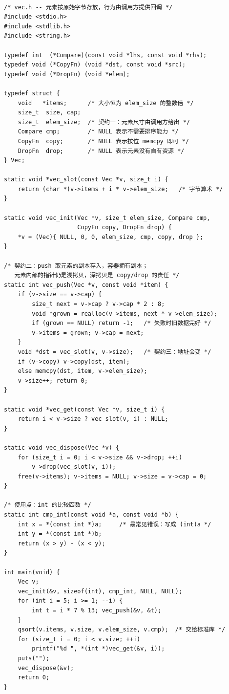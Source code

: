 \documentclass[12pt,a4paper,fontset=fandol]{ctexbook}
\newcommand{\clabel}{%
  \tcbox[on line,colback=cheadbg,colframe=cheadbg,
    boxrule=0pt,arc=1pt,left=2pt,right=2pt,top=1pt,bottom=1pt,
    colupper=white,fontupper=\scriptsize\bfseries]{C}}
\begin{document}
\clabel\ \begin{lstlisting}[style=cstyle,caption={字节存储 + 回调的通用向量：接口即契约}]
/* vec.h -- 元素按原始字节存放，行为由调用方提供回调 */
#include <stdio.h>
#include <stdlib.h>
#include <string.h>

typedef int  (*Compare)(const void *lhs, const void *rhs);
typedef void (*CopyFn) (void *dst, const void *src);
typedef void (*DropFn) (void *elem);

typedef struct {
    void   *items;      /* 大小恒为 elem_size 的整数倍 */
    size_t  size, cap;
    size_t  elem_size;  /* 契约一：元素尺寸由调用方给出 */
    Compare cmp;        /* NULL 表示不需要排序能力 */
    CopyFn  copy;       /* NULL 表示按位 memcpy 即可 */
    DropFn  drop;       /* NULL 表示元素没有自有资源 */
} Vec;

static void *vec_slot(const Vec *v, size_t i) {
    return (char *)v->items + i * v->elem_size;   /* 字节算术 */
}

static void vec_init(Vec *v, size_t elem_size, Compare cmp,
                     CopyFn copy, DropFn drop) {
    *v = (Vec){ NULL, 0, 0, elem_size, cmp, copy, drop };
}

/* 契约二：push 取元素的副本存入，容器拥有副本；
   元素内部的指针仍是浅拷贝，深拷贝是 copy/drop 的责任 */
static int vec_push(Vec *v, const void *item) {
    if (v->size == v->cap) {
        size_t next = v->cap ? v->cap * 2 : 8;
        void *grown = realloc(v->items, next * v->elem_size);
        if (grown == NULL) return -1;   /* 失败时旧数据完好 */
        v->items = grown; v->cap = next;
    }
    void *dst = vec_slot(v, v->size);   /* 契约三：地址会变 */
    if (v->copy) v->copy(dst, item);
    else memcpy(dst, item, v->elem_size);
    v->size++; return 0;
}

static void *vec_get(const Vec *v, size_t i) {
    return i < v->size ? vec_slot(v, i) : NULL;
}

static void vec_dispose(Vec *v) {
    for (size_t i = 0; i < v->size && v->drop; ++i)
        v->drop(vec_slot(v, i));
    free(v->items); v->items = NULL; v->size = v->cap = 0;
}

/* 使用点：int 的比较函数 */
static int cmp_int(const void *a, const void *b) {
    int x = *(const int *)a;     /* 最常见错误：写成 (int)a */
    int y = *(const int *)b;
    return (x > y) - (x < y);
}

int main(void) {
    Vec v;
    vec_init(&v, sizeof(int), cmp_int, NULL, NULL);
    for (int i = 5; i >= 1; --i) {
        int t = i * 7 % 13; vec_push(&v, &t);
    }
    qsort(v.items, v.size, v.elem_size, v.cmp);  /* 交给标准库 */
    for (size_t i = 0; i < v.size; ++i)
        printf("%d ", *(int *)vec_get(&v, i));
    puts("");
    vec_dispose(&v);
    return 0;
}
\end{lstlisting}
\end{document}

